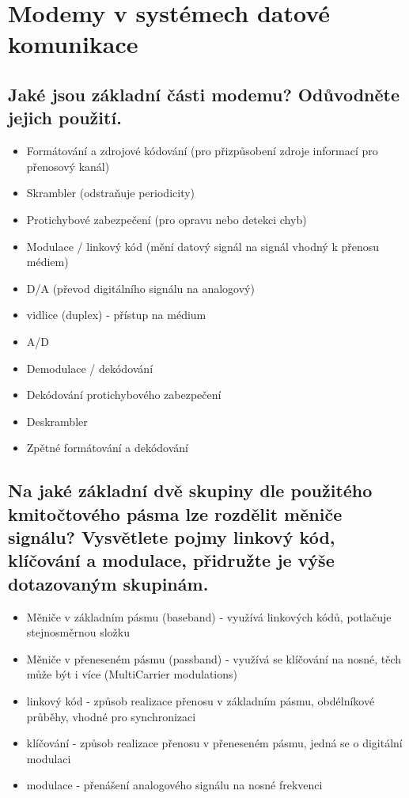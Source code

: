 \clearpage
\section{Modemy v systémech datové komunikace}
\subsection{Jaké jsou základní části modemu? Odůvodněte jejich použití.}
\begin{itemize}
    \item Formátování a zdrojové kódování (pro přizpůsobení zdroje informací pro přenosový kanál)
    \item Skrambler (odstraňuje periodicity)
    \item Protichybové zabezpečení (pro opravu nebo detekci chyb)
    \item Modulace / linkový kód (mění datový signál na signál vhodný k přenosu médiem)
    \item D/A (převod digitálního signálu na analogový)
    \item vidlice (duplex) - přístup na médium
    \item A/D
    \item Demodulace / dekódování
    \item Dekódování protichybového  zabezpečení
    \item Deskrambler
    \item Zpětné formátování a dekódování
\end{itemize}

\subsection{Na jaké základní dvě skupiny dle použitého kmitočtového pásma lze rozdělit měniče
signálu? Vysvětlete pojmy linkový kód, klíčování a modulace, přidružte je výše
dotazovaným skupinám.}
\begin{itemize}
    \item Měniče v základním pásmu (baseband) - využívá linkových kódů, potlačuje stejnosměrnou složku
    \item Měniče v přeneseném pásmu (passband) - využívá se klíčování na nosné, těch může být i více 
    (MultiCarrier modulations)
    \item linkový kód - způsob realizace přenosu v základním pásmu, obdélníkové průběhy, vhodné pro synchronizaci
    \item klíčování - způsob realizace přenosu v přeneseném pásmu, jedná se o digitální modulaci
    \item modulace - přenášení analogového signálu na nosné frekvenci
\end{itemize}

